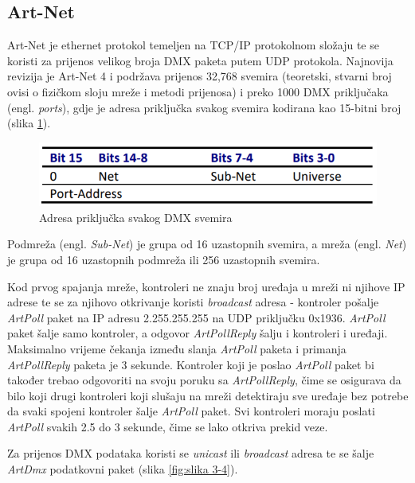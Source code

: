 \documentclass[times, utf8, zavrsni, numeric]{fer}
\begin{document}
\subsection{Art-Net}
Art-Net je ethernet protokol temeljen na TCP/IP protokolnom složaju te se koristi za prijenos velikog broja DMX paketa putem UDP protokola. Najnovija revizija je Art-Net 4 i podržava prijenos 32,768 svemira (teoretski, stvarni broj ovisi o fizičkom sloju mreže i metodi prijenosa) i preko 1000 DMX priključaka (engl. \emph{ports}), gdje je adresa priključka svakog svemira kodirana kao 15-bitni broj (slika \ref{fig:slika 3-3}).

\begin{figure}[htp]
	\centering
	\includegraphics[width=\linewidth]{slika 3-3.png}
	\caption{Adresa priključka svakog DMX svemira \cite{art-net}}
	\label{fig:slika 3-3}
\end{figure}

Podmreža (engl. \emph{Sub-Net}) je grupa od 16 uzastopnih svemira, a mreža (engl. \emph{Net}) je grupa od 16 uzastopnih podmreža ili 256 uzastopnih svemira. \newline

Kod prvog spajanja mreže, kontroleri ne znaju broj uređaja u mreži ni njihove IP adrese te se za njihovo otkrivanje koristi \emph{broadcast} adresa - kontroler pošalje \emph{ArtPoll} paket na IP adresu 2.255.255.255 na UDP priključku 0x1936. \emph{ArtPoll} paket šalje samo kontroler, a odgovor \emph{ArtPollReply} šalju i kontroleri i uređaji. Maksimalno vrijeme čekanja između slanja \emph{ArtPoll} paketa i primanja \emph{ArtPollReply} paketa je 3 sekunde. Kontroler koji je poslao \emph{ArtPoll} paket bi također trebao odgovoriti na svoju poruku sa \emph{ArtPollReply}, čime se osigurava da bilo koji drugi kontroleri koji slušaju na mreži detektiraju sve uređaje bez potrebe da svaki spojeni kontroler šalje \emph{ArtPoll} paket. Svi kontroleri moraju poslati \emph{ArtPoll} svakih 2.5 do 3 sekunde, čime se lako otkriva prekid veze. \newline

Za prijenos DMX podataka koristi se \emph{unicast} ili \emph{broadcast} adresa te se šalje \emph{ArtDmx} podatkovni paket (slika \ref{fig:slika 3-4}).
\end{document}
